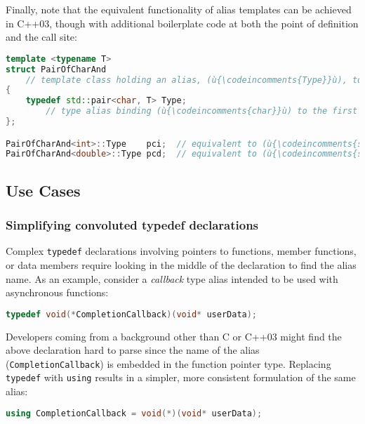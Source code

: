 \noindent Finally, note that the equivalent functionality of alias templates can be
achieved in C++03, though with additional boilerplate code at both the
point of definition and the call site:

\begin{lstlisting}[language=C++]
template <typename T>
struct PairOfCharAnd
    // template class holding an alias, (ù{\codeincomments{Type}}ù), to (ù{\codeincomments{std::pair<char, T>}}ù)
{
    typedef std::pair<char, T> Type;
        // type alias binding (ù{\codeincomments{char}}ù) to the first type parameter of (ù{\codeincomments{std::pair}}ù)
};

PairOfCharAnd<int>::Type    pci;  // equivalent to (ù{\codeincomments{std::pair<char, int> pci;}}ù)
PairOfCharAnd<double>::Type pcd;  // equivalent to (ù{\codeincomments{std::pair<char, double> pcd;}}ù)
\end{lstlisting}
    

\subsection[Use Cases]{Use Cases}\label{use-cases}

\subsubsection[Simplifying convoluted {\tt typedef} declarations]{Simplifying convoluted {\SubsubsecCode typedef} declarations}\label{simplifying-convoluted-typedef-declarations}

Complex \texttt{typedef} declarations involving pointers to functions,
member functions, or data members require looking in the middle of the
declaration to find the alias name. As an example, consider a
\emph{callback} type alias intended to be used with asynchronous functions:

\begin{lstlisting}[language=C++]
typedef void(*CompletionCallback)(void* userData);
\end{lstlisting}
    
\noindent Developers coming from a background other than C or C++03 might find the
above declaration hard to parse since the name of the alias
(\texttt{CompletionCallback}) is embedded in the function pointer type.
Replacing \texttt{typedef} with \texttt{using} results in a simpler,
more consistent formulation of the same alias:

\begin{lstlisting}[language=C++]
using CompletionCallback = void(*)(void* userData);
\end{lstlisting}
    
